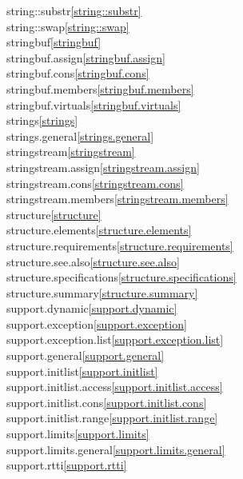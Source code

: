 \begin{multicols}{2}
string::substr\quad\ref{string::substr}\\
string::swap\quad\ref{string::swap}\\
stringbuf\quad\ref{stringbuf}\\
stringbuf.assign\quad\ref{stringbuf.assign}\\
stringbuf.cons\quad\ref{stringbuf.cons}\\
stringbuf.members\quad\ref{stringbuf.members}\\
stringbuf.virtuals\quad\ref{stringbuf.virtuals}\\
strings\quad\ref{strings}\\
strings.general\quad\ref{strings.general}\\
stringstream\quad\ref{stringstream}\\
stringstream.assign\quad\ref{stringstream.assign}\\
stringstream.cons\quad\ref{stringstream.cons}\\
stringstream.members\quad\ref{stringstream.members}\\
structure\quad\ref{structure}\\
structure.elements\quad\ref{structure.elements}\\
structure.requirements\quad\ref{structure.requirements}\\
structure.see.also\quad\ref{structure.see.also}\\
structure.specifications\quad\ref{structure.specifications}\\
structure.summary\quad\ref{structure.summary}\\
support.dynamic\quad\ref{support.dynamic}\\
support.exception\quad\ref{support.exception}\\
support.exception.list\quad\ref{support.exception.list}\\
support.general\quad\ref{support.general}\\
support.initlist\quad\ref{support.initlist}\\
support.initlist.access\quad\ref{support.initlist.access}\\
support.initlist.cons\quad\ref{support.initlist.cons}\\
support.initlist.range\quad\ref{support.initlist.range}\\
support.limits\quad\ref{support.limits}\\
support.limits.general\quad\ref{support.limits.general}\\
support.rtti\quad\ref{support.rtti}\\

\end{multicols}
